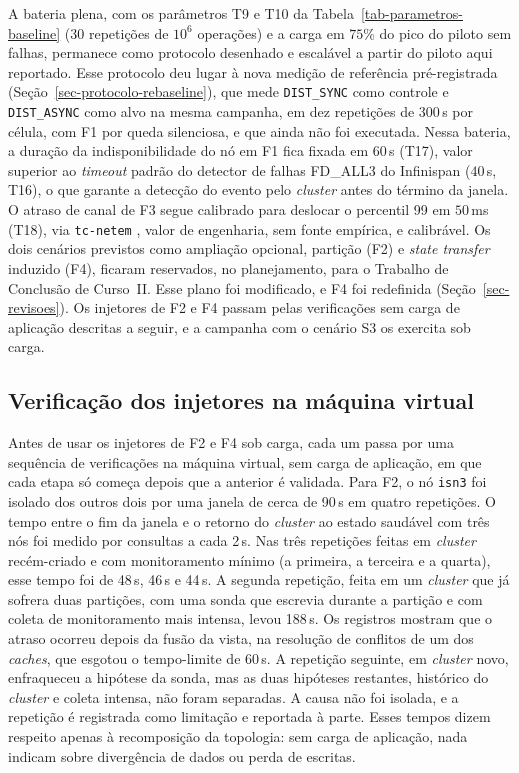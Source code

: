 A bateria plena, com os parâmetros T9 e T10 da Tabela~\ref{tab-parametros-baseline} (30 repetições de $10^6$ operações) e a carga em $75\%$ do pico do piloto sem falhas, permanece como protocolo desenhado e escalável a partir do piloto aqui reportado. Esse protocolo deu lugar à nova medição de referência pré-registrada (Seção~\ref{sec-protocolo-rebaseline}), que mede \texttt{DIST\_SYNC} como controle e \texttt{DIST\_ASYNC} como alvo na mesma campanha, em dez repetições de 300\,s por célula, com F1 por queda silenciosa, e que ainda não foi executada. Nessa bateria, a duração da indisponibilidade do nó em F1 fica fixada em $60$\,s (T17), valor superior ao \emph{timeout} padrão do detector de falhas FD\_ALL3 do Infinispan ($40$\,s, T16), o que garante a detecção do evento pelo \emph{cluster} antes do término da janela. O atraso de canal de F3 segue calibrado para deslocar o percentil 99 em $50$\,ms (T18), via \texttt{tc-netem} \citep{netem_manpage}, valor de engenharia, sem fonte empírica, e calibrável. Os dois cenários previstos como ampliação opcional, partição (F2) e \emph{state transfer} induzido (F4), ficaram reservados, no planejamento, para o Trabalho de Conclusão de Curso~II. Esse plano foi modificado, e F4 foi redefinida (Seção~\ref{sec-revisoes}). Os injetores de F2 e F4 passam pelas verificações sem carga de aplicação descritas a seguir, e a campanha com o cenário S3 os exercita sob carga.

\subsection*{Verificação dos injetores na máquina virtual}
\label{sec-verificacao-injetores}

Antes de usar os injetores de F2 e F4 sob carga, cada um passa por uma sequência de verificações na máquina virtual, sem carga de aplicação, em que cada etapa só começa depois que a anterior é validada. Para F2, o nó \texttt{isn3} foi isolado dos outros dois por uma janela de cerca de 90\,s em quatro repetições. O tempo entre o fim da janela e o retorno do \emph{cluster} ao estado saudável com três nós foi medido por consultas a cada 2\,s. Nas três repetições feitas em \emph{cluster} recém-criado e com monitoramento mínimo (a primeira, a terceira e a quarta), esse tempo foi de 48\,s, 46\,s e 44\,s. A segunda repetição, feita em um \emph{cluster} que já sofrera duas partições, com uma sonda que escrevia durante a partição e com coleta de monitoramento mais intensa, levou 188\,s. Os registros mostram que o atraso ocorreu depois da fusão da vista, na resolução de conflitos de um dos \emph{caches}, que esgotou o tempo-limite de 60\,s. A repetição seguinte, em \emph{cluster} novo, enfraqueceu a hipótese da sonda, mas as duas hipóteses restantes, histórico do \emph{cluster} e coleta intensa, não foram separadas. A causa não foi isolada, e a repetição é registrada como limitação e reportada à parte. Esses tempos dizem respeito apenas à recomposição da topologia: sem carga de aplicação, nada indicam sobre divergência de dados ou perda de escritas.

